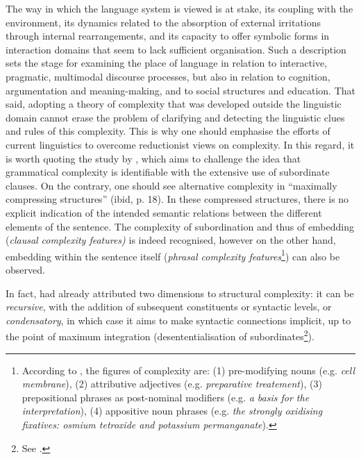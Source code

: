 \documentclass[output=paper]{langscibook}
\begin{document}
The way in which the language system is viewed is at stake, its coupling with the environment, its dynamics related to the absorption of external irritations through internal rearrangements, and its capacity to offer symbolic forms in interaction domains that seem to lack sufficient organisation. Such a description sets the stage for examining the place of language in relation to interactive, pragmatic, multimodal discourse processes, but also in relation to cognition, argumentation and meaning-making, and to social structures and education. That said, adopting a theory of complexity that was developed outside the linguistic domain cannot erase the problem of clarifying and detecting the linguistic clues and rules of this complexity. This is why one should emphasise the efforts of current linguistics to overcome reductionist views on complexity. In this regard, it is worth quoting the study by \citet{BiberGray2016}, which aims to challenge the idea that grammatical complexity is identifiable with the extensive use of subordinate clauses. On the contrary, one should see alternative complexity in “maximally compressing structures” (ibid, p. 18). In these compressed structures, there is no explicit indication of the intended semantic relations between the different elements of the sentence. The complexity of subordination and thus of embedding (\textit{clausal complexity features)} is indeed recognised, however on the other hand, embedding within the sentence itself (\textit{phrasal complexity features}\footnote{According to \citet[246]{BiberGray2016}, the figures of complexity are: (1) pre-modifying nouns (e.g. \textit{cell membrane}), (2) attributive adjectives (e.g. \textit{preparative treatement}), (3) prepositional phrases as post-nominal modifiers (e.g. \textit{a basis for the interpretation}), (4) appositive noun phrases (e.g. \textit{the strongly oxidising fixatives: osmium tetroxide and potassium permanganate}).}) can also be observed.

In fact, \citet{Givón2009} had already attributed two dimensions to structural complexity: it can be \textit{recursive}, with the addition of subsequent constituents or syntactic levels, or \textit{condensatory}, in which case it aims to make syntactic connections implicit, up to the point of maximum integration (desententialisation of subordinates\footnote{See \cites[]{Lehmann1989}[87]{Havu2017}.}). 
\end{document}
